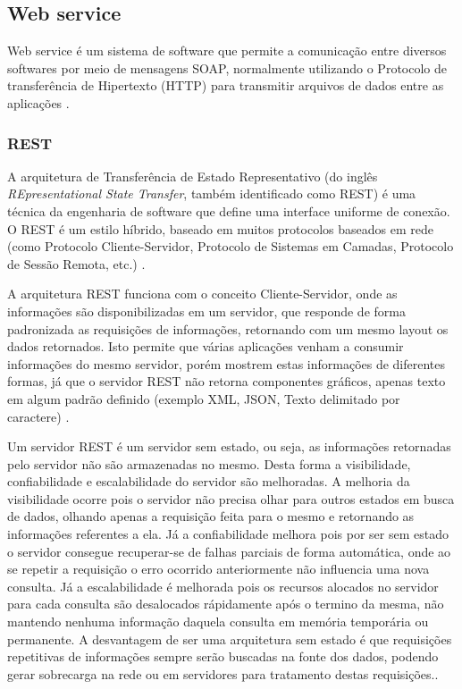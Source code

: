 \subsection{Web service}
Web service é um sistema de software que permite a comunicação entre diversos softwares por meio de mensagens SOAP, normalmente utilizando o Protocolo de transferência de Hipertexto (HTTP) para transmitir arquivos de dados entre as aplicações \cite{W3C}.
\subsubsection{REST}
A arquitetura de Transferência de Estado Representativo (do inglês \emph{REpresentational State Transfer}, também identificado como REST) é uma técnica da engenharia de software que define uma interface uniforme de conexão. O REST é um estilo híbrido, baseado em muitos protocolos baseados em rede (como Protocolo Cliente-Servidor, Protocolo de Sistemas em Camadas, Protocolo de Sessão Remota, etc.) \cite{RESTFielding}.

A arquitetura REST funciona com o conceito Cliente-Servidor, onde as informações são disponibilizadas em um servidor, que responde de forma padronizada as requisições de informações, retornando com um mesmo layout os dados retornados. Isto permite que várias aplicações venham a consumir informações do mesmo servidor, porém mostrem estas informações de diferentes formas, já que o servidor REST não retorna componentes gráficos, apenas texto em algum padrão definido (exemplo XML, JSON, Texto delimitado por caractere) \cite{RESTFielding}.

Um servidor REST é um servidor sem estado, ou seja, as informações retornadas pelo servidor não são armazenadas no mesmo. Desta forma a visibilidade, confiabilidade e escalabilidade do servidor são melhoradas. A melhoria da visibilidade ocorre pois o servidor não precisa olhar para outros estados em busca de dados, olhando apenas a requisição feita para o mesmo e retornando as informações referentes a ela. Já a confiabilidade melhora pois por ser sem estado o servidor consegue recuperar-se de falhas parciais de forma automática, onde ao se repetir a requisição o erro ocorrido anteriormente não influencia uma nova consulta. Já a escalabilidade é melhorada pois os recursos alocados no servidor para cada consulta são desalocados rápidamente após o termino da mesma, não mantendo nenhuma informação daquela consulta em memória temporária ou permanente. A desvantagem de ser uma arquitetura sem estado é que requisições repetitivas de informações sempre serão buscadas na fonte dos dados, podendo gerar sobrecarga na rede ou em servidores para tratamento destas requisições.\cite{RESTFielding}.

